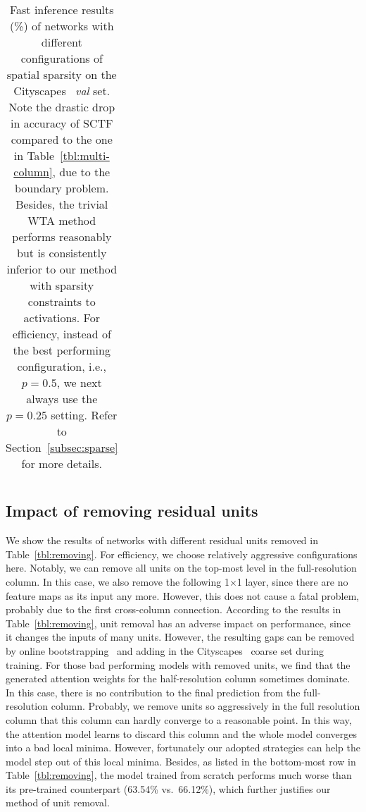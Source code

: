 \documentclass[10pt,twocolumn,letterpaper]{article}
\begin{document}
\begin{table*}
\begin{center}
{\begin{tabular}{l|l|l|c|c|c|c|c|c|c}
\hline
\end{tabular}
}
\end{center}
\vspace{-2.0mm}
\caption{Fast inference results (\%) of networks with different configurations of spatial sparsity on the Cityscapes~\cite{Cityscapes.CVPR.2016.Cordts} \textit{val} set.
Note the drastic drop in accuracy of SCTF compared to the one in Table~\ref{tbl:multi-column},
due to the boundary problem.
Besides, the trivial WTA method performs reasonably but is consistently inferior to our method with sparsity constraints to activations.
For efficiency, instead of the best performing configuration, i.e., $p=0.5$,
we next always use the $p=0.25$ setting.
Refer to Section~\ref{subsec:sparse} for more details.
}
\label{tbl:sparse}
\vspace{-4.0mm}
\end{table*}


%
\subsection{Impact of removing residual units}\label{subsec:removing}
We show the results of networks with different residual units removed in Table~\ref{tbl:removing}.
For efficiency, we choose relatively aggressive configurations here.
Notably, we can remove all units on the top-most level in the full-resolution column.
In this case, we also remove the following 1$\times$1 layer,
since there are no feature maps as its input any more.
However, this does not cause a fatal problem,
probably due to the first cross-column connection.
According to the results in Table~\ref{tbl:removing},
unit removal has an adverse impact on performance,
since it changes the inputs of many units.
However, the resulting gaps can be removed by online bootstrapping~\cite{InstanceSegmentation.2016.Wu} and adding in the Cityscapes~\cite{Cityscapes.CVPR.2016.Cordts} coarse set during training.
For those bad performing models with removed units,
we find that the generated attention weights for the half-resolution column sometimes dominate.
In this case, there is no contribution to the final prediction from the full-resolution column.
Probably, we remove units so aggressively in the full resolution column that this column can hardly converge to a reasonable point.
In this way, the attention model learns to discard this column and the whole model converges into a bad local minima.
However, fortunately our adopted strategies can help the model step out of this local minima.
Besides, as listed in the bottom-most row in Table~\ref{tbl:removing},
the model trained from scratch performs much worse than its pre-trained counterpart (63.54\% vs.~66.12\%),
which further justifies our method of unit removal.
\end{document}
